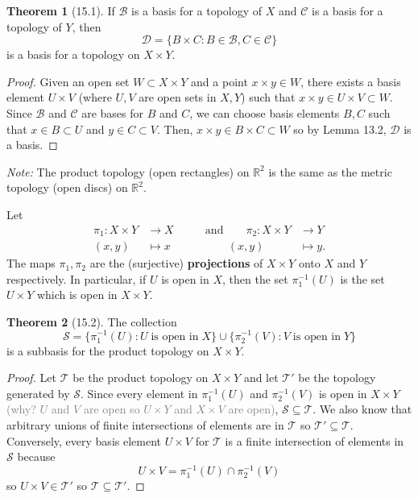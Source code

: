 \documentclass{article}
\newcommand{\nline}{\vspace*{0.5\baselineskip}}
\newcommand{\com}[1]{\textcolor{grey}{#1}}
\theoremstyle{definition}
\newtheorem{theorem}{Theorem}[subsection]
\begin{document}
\begin{flushleft}
\begin{theorem}[15.1]
If $\mathcal{B}$ is a basis for a topology of $X$ and $\mathcal{C}$ is a basis for a topology of $Y$, then
\[
\mathcal{D} = \{ B \times C : B \in \mathcal{B}, C \in \mathcal{C} \}
\]
is a basis for a topology on $X \times Y$.
\end{theorem}

\begin{proof}
Given an open set $W \subset X \times Y$ and a point $x \times y \in W$, there exists a basis element $U \times V$ (where $U, V$ are open sets in $X, Y$) such that $x \times y \in U \times V \subset W$. Since $\mathcal{B}$ and $\mathcal{C}$ are bases for $B$ and $C$, we can choose basis elements $B, C$ such that $x \in B \subset U$ and $y \in C \subset V$. Then, $x \times y \in B \times C \subset W$ so by Lemma 13.2, $\mathcal{D}$ is a basis.
\end{proof}

\textit{Note:} The product topology (open rectangles) on $\mathbb{R}^2$ is the same as the metric topology (open discs) on $\mathbb{R}^2$.

\nline

Let
\[
\begin{align}
\pi_1: X \times Y &\longrightarrow X \qquad &\text{and} \qquad \pi_2: X \times Y &\longrightarrow Y \\
(x,y) &\longmapsto x \qquad &\text{} \qquad (x,y) &\longmapsto y.
\end{align}
\]
The maps $\pi_1, \pi_2$ are the (surjective) \textbf{projections} of $X \times Y$ onto $X$ and $Y$ respectively. In particular, if $U$ is open in $X$, then the set $\pi_1^{-1}(U)$ is the set $U \times Y$ which is open in $X \times Y$.

\begin{theorem}[15.2]
The collection
\[
\mathcal{S} = \{ \pi_1^{-1}(U) : U \; \text{is open in} \; X \} \cup \{ \pi_2^{-1}(V) : V \; \text{is open in} \; Y \}
\]
is a subbasis for the product topology on $X \times Y$.
\end{theorem}

\begin{proof}
Let $\mathcal{T}$ be the product topology on $X \times Y$ and let $\mathcal{T}'$ be the topology generated by $\mathcal{S}$. Since every element in $\pi_1^{-1}(U)$ and $\pi_2^{-1}(V)$ is open in $X \times Y$ \com{(why? $U$ and $V$ are open so $U \times Y$ and $X \times V$ are open)}, $\mathcal{S} \subseteq \mathcal{T}$. We also know that arbitrary unions of finite intersections of elements are in $\mathcal{T}$ so $\mathcal{T}' \subseteq \mathcal{T}$. Conversely, every basis element $U \times V$ for $\mathcal{T}$ is a finite intersection of elements in $\mathcal{S}$ because
\[
U \times V = \pi_1^{-1}(U) \cap \pi_2^{-1}(V)
\]
so $U \times V \in \mathcal{T}'$ so $\mathcal{T} \subseteq \mathcal{T}'$.
\end{proof}


\end{flushleft}
\end{document}
